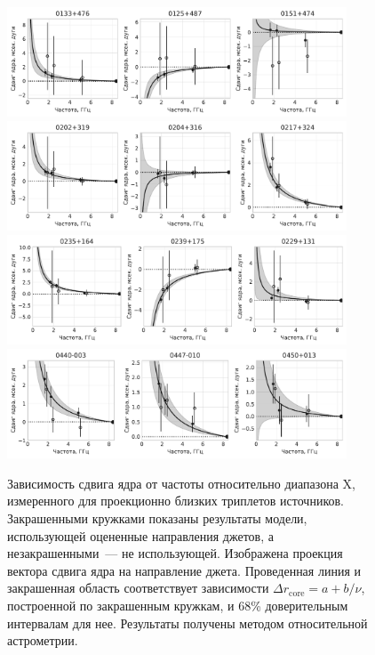 \begin{figure}
 \centering
 \includegraphics[width=0.9\textwidth]{freqdep/0}
 \includegraphics[width=0.9\textwidth]{freqdep/1}
 \includegraphics[width=0.9\textwidth]{freqdep/2}
 \includegraphics[width=0.9\textwidth]{freqdep/3}
 \caption{Зависимость сдвига ядра от частоты относительно диапазона X, измеренного для проекционно
близких триплетов источников. Закрашенными кружками показаны результаты модели, использующей
оцененные направления джетов, а незакрашенными~--- не использующей. Изображена проекция вектора
сдвига ядра на направление джета. Проведенная линия и закрашенная область соответствует зависимости
$\Delta r_\mathrm{core} = a + b/\nu$, построенной по закрашенным кружкам, и 68\% доверительным
интервалам для нее. Результаты получены методом относительной астрометрии.}
 \label{fig:cs_freqdep_astrom}
\end{figure}

